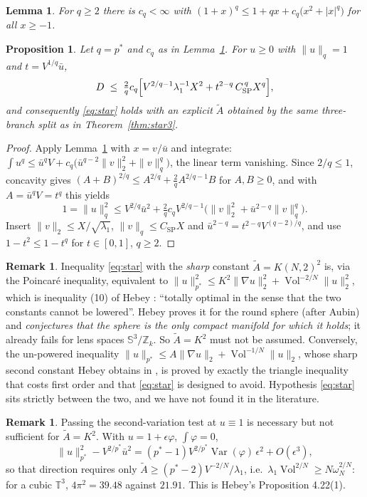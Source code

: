 \documentclass[11pt,reqno]{amsart}
\theoremstyle{plain}
\newtheorem{proposition}[theorem]{Proposition}
\newtheorem{lemma}[theorem]{Lemma}
\theoremstyle{definition}
\newtheorem{remark}[theorem]{Remark}
\newcommand{\Tor}{\mathbb{T}}
\newcommand{\Sph}{\mathbb{S}}
\newcommand{\pstar}{p^{*}}
\newcommand{\Vol}{\operatorname{Vol}}
\newcommand{\Ksob}{K}
\newcommand{\Csp}{C_{\mathrm{SP}}}
\newcommand{\Atil}{\widetilde{A}}
\begin{document}
\begin{lemma}
\label{lem:elem}
For $q\ge2$ there is $c_q<\infty$ with
$(1+x)^q\le1+qx+c_q\bigl(x^2+|x|^q\bigr)$ for all $x\ge-1$.
\end{lemma}

\begin{proposition}
\label{prop:starN}
Let $q=\pstar$ and $c_q$ as in Lemma~\ref{lem:elem}. For $u\ge0$ with
$\|u\|_{q}=1$ and $t=V^{1/q}\bar u$,
\[
  D\;\le\;\tfrac{2}{q}c_q\Bigl[V^{2/q-1}\lambda_1^{-1}X^2
        +t^{2-q}\,\Csp^{\,q}X^{q}\Bigr],
\]
and consequently \eqref{eq:star} holds with an explicit $\Atil$ obtained by the
same three-branch split as in Theorem~\ref{thm:star3}.
\end{proposition}

\begin{proof}
Apply Lemma~\ref{lem:elem} with $x=v/\bar u$ and integrate:
$\int u^q\le\bar u^qV+c_q\bigl(\bar u^{q-2}\|v\|_2^2+\|v\|_q^q\bigr)$, the linear
term vanishing. Since $2/q\le1$, concavity gives
$(A+B)^{2/q}\le A^{2/q}+\tfrac2qA^{2/q-1}B$ for $A,B\ge0$, and with
$A=\bar u^qV=t^q$ this yields
\[
  1=\|u\|_q^2\le V^{2/q}\bar u^2
     +\tfrac2qc_qV^{2/q-1}\bigl(\|v\|_2^2+\bar u^{2-q}\|v\|_q^q\bigr).
\]
Insert $\|v\|_2\le X/\sqrt{\lambda_1}$, $\|v\|_q\le\Csp X$ and
$\bar u^{2-q}=t^{2-q}V^{(q-2)/q}$, and use $1-t^2\le1-t^q$ for $t\in[0,1]$,
$q\ge2$.
\end{proof}

\begin{remark}
\label{rem:hebey}
Inequality \eqref{eq:star} with the \emph{sharp} constant $\Atil=\Ksob(N,2)^2$ is,
via the Poincaré inequality, equivalent to
$\|u\|^2_{\pstar}\le\Ksob^2\|\nabla u\|^2_2+\Vol^{-2/N}\|u\|_2^2$, which is
inequality (10) of Hebey \cite[\S4.5]{Hebey1996}: ``totally optimal in the sense
that the two constants cannot be lowered''. Hebey proves it for the round sphere
(after Aubin) and \emph{conjectures that the sphere is the only compact manifold
for which it holds}; it already fails for lens spaces $\Sph^3/\mathbb{Z}_k$. So
$\Atil=\Ksob^2$ must not be assumed. Conversely, the un-powered inequality
$\|u\|_{\pstar}\le A\|\nabla u\|_2+\Vol^{-1/N}\|u\|_2$, whose sharp second
constant Hebey obtains in \cite[\S4.1]{Hebey1996}, is proved by exactly the
triangle inequality that costs first order and that \eqref{eq:star} is designed to
avoid. Hypothesis \eqref{eq:star} sits strictly between the two, and we have not
found it in the literature.
\end{remark}

\begin{remark}\label{rem:passing_second_variation_test_necessary}
Passing the second-variation test at $u\equiv1$ is necessary but not sufficient
for $\Atil=\Ksob^2$. With $u=1+\epsilon\varphi$, $\int\varphi=0$,
\[
  \|u\|^2_{\pstar}-V^{2/\pstar}\bar u^2
   =(\pstar-1)V^{2/\pstar}\operatorname{Var}(\varphi)\,\epsilon^2+O(\epsilon^3),
\]
so that direction requires only $\Atil\ge(\pstar-2)V^{-2/N}/\lambda_1$, i.e.\
$\lambda_1\Vol^{2/N}\ge N\omega_N^{2/N}$: for a cubic $\Tor^3$,
$4\pi^2=39.48$ against $21.91$. This is Hebey's Proposition 4.22(1).
\end{remark}
\end{document}
